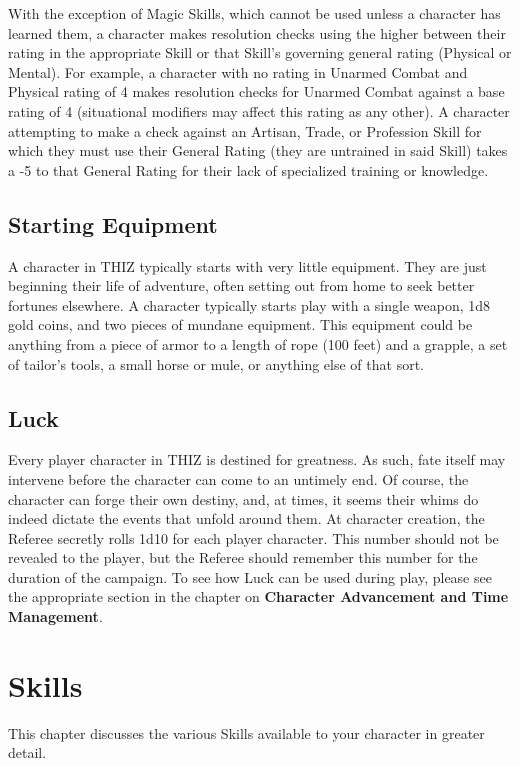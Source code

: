 \documentclass[oneside]{book}
\begin{document}
With the exception of Magic Skills, which cannot be used unless a character has learned them, a character makes resolution checks using the higher between their rating in the appropriate Skill or that Skill's governing general rating (Physical or Mental). For example, a character with no rating in Unarmed Combat and Physical rating of 4 makes resolution checks for Unarmed Combat against a base rating of 4 (situational modifiers may affect this rating as any other). A character attempting to make a check against an Artisan, Trade, or Profession Skill for which they must use their General Rating (they are untrained in said Skill) takes a -5 to that General Rating for their lack of specialized training or knowledge.

\section{Starting Equipment}
A character in THIZ typically starts with very little equipment. They are just beginning their life of adventure, often setting out from home to seek better fortunes elsewhere. A character typically starts play with a single weapon, 1d8 gold coins, and two pieces of mundane equipment. This equipment could be anything from a piece of armor to a length of rope (100 feet) and a grapple, a set of tailor's tools, a small horse or mule, or anything else of that sort. 

\section{Luck}
Every player character in THIZ is destined for greatness. As such, fate itself may intervene before the character can come to an untimely end. Of course, the character can forge their own destiny, and, at times, it seems their whims do indeed dictate the events that unfold around them.  At character creation, the Referee secretly rolls 1d10 for each player character. This number should not be revealed to the player, but the Referee should remember this number for the duration of the campaign. To see how Luck can be used during play, please see the appropriate section in the chapter on \textbf{Character Advancement and Time Management}.

\chapter{Skills}
This chapter discusses the various Skills available to your character in greater detail.
\end{document}
